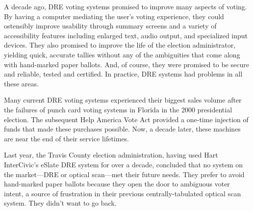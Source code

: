 \label{sec:intro}

A decade ago, DRE voting systems promised to improve many aspects of voting. 
By having a
computer mediating the user's voting experience, they could ostensibly
improve usability through summary screens and a
variety of accessibility features including enlarged text, audio
output, and specialized input devices. They also promised to improve
the life of the election administrator, yielding quick, accurate tallies without
any of the ambiguities that come along with hand-marked paper ballots.
And, of course, they were promised to be secure and reliable, tested
and certified. In practice, DRE systems had problems in all these areas.

Many current DRE voting systems experienced their biggest sales
volume after the failures of punch card voting
systems in Florida in the 2000 presidential election. 
The subsequent Help America Vote Act
provided a one-time injection of funds that made these purchases
possible. Now, a decade later, these machines are near the end of
their service lifetimes. 

Last year, the Travis County election administration, having used
Hart InterCivic's eSlate DRE system for over a decade,
concluded that no system on the 
market---DRE or optical scan---met their future needs. 
They prefer to avoid
hand-marked paper ballots because they
open the door to ambiguous voter intent, a source of
frustration in their previous centrally-tabulated optical scan
system. 
They didn't want to go back.


